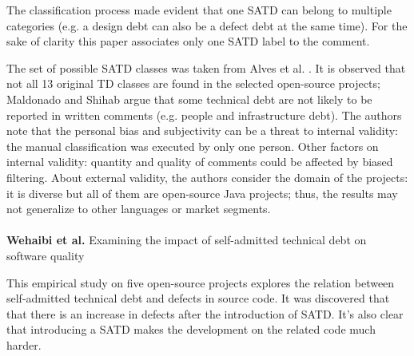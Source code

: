 The classification process made evident that one SATD can belong to multiple categories (e.g. a design debt can also be a defect debt at the same time). For the sake of clarity this paper associates only one SATD label to the comment. 

The set of possible SATD classes was taken from Alves et al. \cite{alves2014towards}. It is observed that not all 13 original TD classes are found in the selected open-source projects; Maldonado and Shihab argue that some technical debt are not likely to be reported in written comments (e.g. people and infrastructure debt).
The authors note that the personal bias and subjectivity can be a threat to internal validity: the manual classification was executed by only one person. Other factors on internal validity: quantity and quality of comments could be affected by biased filtering.
About external validity, the authors consider the domain of the projects: it is diverse but all of them are open-source Java projects; thus,  the results may not generalize to other languages or market segments.
\\
\\
\textbf{Wehaibi et al.} \cite{wehaibi2016examining} Examining the impact of self-admitted technical debt on software quality

This empirical study on five open-source projects explores the relation between self-admitted technical debt and defects in source code. It was discovered that that there is an increase in defects after the introduction of SATD. It's also clear that introducing a SATD makes the development on the related code much harder.
\\
\\
